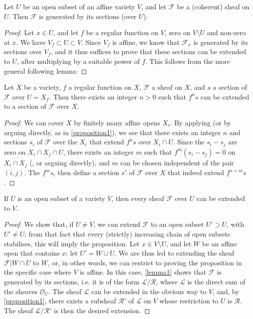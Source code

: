 \documentclass[10pt]{article}
\theoremstyle{plain}
\newenvironment{proposition}[1]
  {\renewcommand\theinnercustomproposition{#1}\innercustomproposition}
  {\endinnercustomproposition}
\newenvironment{lemma}[1]
  {\renewcommand\theinnercustomlemma{#1}\innercustomlemma}
  {\endinnercustomlemma}
\theoremstyle{definition}
\newcommand{\sh}{\mathscr}
\newcommand{\oldpage}[1]{\marginpar{\textit{p.~#1}}}
\begin{document}
\begin{lemma}{1}
\label{lemma1}
  Let $U$ be an open subset of an affine variety $V$, and let $\sh{F}$ be a (coherent) sheaf on $U$.
  Then $\sh{F}$ is generated by its sections (over $U$).
\end{lemma}

\begin{proof}
  Let $x\in U$, and let $f$ be a regular function on $V$, zero on $V\setminus U$ and non-zero at $x$.
  We have $V_f\subset U\subset V$.
  Since $V_f$ is affine, we know \cite{12} that $\sh{F}_x$ is generated by its sections over $V_f$, and it thus suffices to prove that these sections can be extended to $U$, after multiplying by a suitable power of $f$.
  This follows from the more general following lemma:
\end{proof}

\begin{lemma}{2}
\label{lemma2}
  Let $X$ be a variety, $f$ a regular function on $X$, $\sh{F}$ a sheaf on $X$, and $s$ a section of $\sh{F}$ over $U=X_f$.
  Then there exists an integer $n>0$ such that $f^ns$ can be extended to a section of $\sh{F}$ over $X$.
\end{lemma}

\begin{proof}
  We can cover $X$ by finitely many affine opens $X_i$.
  By applying \cite[lemma~1, p.~247]{12} (or by arguing directly, as in \cref{proposition1}), we see that there exists an integer $n$ and sections $s_i$ of $\sh{F}$ over the $X_i$ that extend $f^ns$ over $X_i\cap U$.
  Since the $s_i-s_j$ are zero on $X_i\cap X_j\cap U$, there exists an integer $m$ such that $f^m(s_i-s_j)=0$ on $X_i\cap X_j$ (\cite[p.~235]{12}, or arguing directly), and $m$ can be chosen independent of the pair $(i,j)$.
  The $f^ms_i$ then define a section $s'$ of $\sh{F}$ over $X$ that indeed extend $f^{n+m}s$.
\end{proof}

\begin{proposition}{2}
\label{proposition2}
\oldpage{99}
  If $U$ is an open subset of a variety $V$, then every sheaf $\sh{F}$ over $U$ can be extended to $V$.
\end{proposition}

\begin{proof}
  We show that, if $U\neq V$, we can extend $\sh{F}$ to an open subset $U'\supset U$, with $U'\neq U$;
  from that fact that every (strictly) increasing chain of open subsets stabilises, this will imply the proposition.
  Let $x\in V\setminus U$, and let $W$ be an affine open that contains $x$;
  let $U'=W\cup U$.
  We are thus led to extending the sheaf $\sh{F}|W\cap U$ to $W$, or, in other words, we can restrict to proving the proposition in the specific case where $V$ is affine.
  In this case, \cref{lemma1} shows that $\sh{F}$ is generated by its sections, i.e. it is of the form $\sh{L}/\sh{R}$, where $\sh{L}$ is the direct sum of the sheaves $\sh{O}_U$.
  The sheaf $\sh{L}$ can be extended in the obvious way to $V$, and, by \cref{proposition1}, there exists a subsheaf $\sh{R}'$ of $\sh{L}$ on $V$ whose restriction to $U$ is $\sh{R}$.
  The sheaf $\sh{L}/\sh{R}'$ is then the desired extension.
\end{proof}
\end{document}
